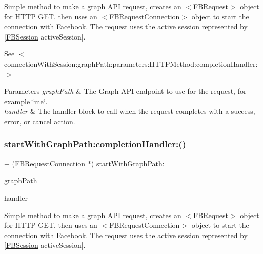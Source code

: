 Simple method to make a graph A\+PI request, creates an $<$\+F\+B\+Request$>$ object for H\+T\+TP G\+ET, then uses an $<$\+F\+B\+Request\+Connection$>$ object to start the connection with \hyperlink{interfaceFacebook}{Facebook}. The request uses the active session represented by {\ttfamily \mbox{[}\hyperlink{interfaceFBSession}{F\+B\+Session} active\+Session\mbox{]}}.

See $<$connection\+With\+Session\+:graph\+Path\+:parameters\+:\+H\+T\+T\+P\+Method\+:completion\+Handler\+:$>$


\begin{DoxyParams}{Parameters}
{\em graph\+Path} & The Graph A\+PI endpoint to use for the request, for example \char`\"{}me\char`\"{}. \\
\hline
{\em handler} & The handler block to call when the request completes with a success, error, or cancel action. \\
\hline
\end{DoxyParams}
\mbox{\label{interfaceFBRequestConnection_ad5b57e64c614dcb04a71e62ee11a87d5}} 
\subsubsection{\texorpdfstring{start\+With\+Graph\+Path\+:completion\+Handler\+:()}{startWithGraphPath:completionHandler:()}\hspace{0.1cm}{\footnotesize\ttfamily [3/5]}}
{\footnotesize\ttfamily + (\hyperlink{interfaceFBRequestConnection}{F\+B\+Request\+Connection} $\ast$) start\+With\+Graph\+Path\+: \begin{DoxyParamCaption}\item[{(N\+S\+String $\ast$)}]{graph\+Path }\item[{completionHandler:(F\+B\+Request\+Handler)}]{handler }\end{DoxyParamCaption}}

Simple method to make a graph A\+PI request, creates an $<$\+F\+B\+Request$>$ object for H\+T\+TP G\+ET, then uses an $<$\+F\+B\+Request\+Connection$>$ object to start the connection with \hyperlink{interfaceFacebook}{Facebook}. The request uses the active session represented by {\ttfamily \mbox{[}\hyperlink{interfaceFBSession}{F\+B\+Session} active\+Session\mbox{]}}.


